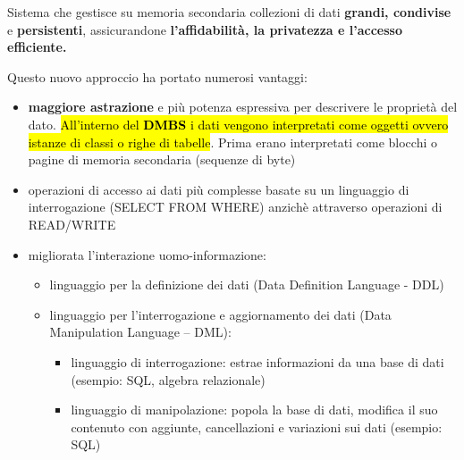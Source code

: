 \documentclass[a4paper, 12pt]{book}
\begin{document}

    \vspace{15pt}

    \begin{tcolorbox}[
      colback=cyan!5!white,
      colframe=blue!50!black,
      title=\textbf{Definizione - DBMS},
      coltitle=white,
      fonttitle=\bfseries,
      arc=3mm,
      boxrule=0.5pt,
      enhanced,
      breakable
    ]
    Sistema che gestisce su memoria secondaria collezioni di dati \textbf{grandi, condivise} e \textbf{persistenti}, assicurandone \textbf{l'affidabilità, la privatezza e l'accesso efficiente.}
    \end{tcolorbox}

    \vspace{15pt}



    Questo nuovo approccio ha portato numerosi vantaggi:
    \begin{itemize}
      \item \textbf{maggiore astrazione} e più potenza espressiva per descrivere le proprietà del dato.
      \hl{All'interno del \textbf{DMBS} i dati vengono interpretati come oggetti ovvero istanze di classi o righe di tabelle}. Prima erano interpretati come blocchi o pagine di memoria secondaria (sequenze di byte)
      \item operazioni di accesso ai dati più complesse basate su un linguaggio di interrogazione (SELECT FROM WHERE) anzichè attraverso operazioni di READ/WRITE
      \item migliorata l'interazione uomo-informazione: 
      \begin{itemize}
        \item linguaggio per la definizione dei dati (Data Definition Language - DDL)
        \item linguaggio per l’interrogazione e aggiornamento dei dati (Data Manipulation Language – DML): 
        \begin{itemize}
          \item linguaggio di interrogazione: estrae informazioni da una base di dati (esempio: SQL, algebra relazionale)
          \item linguaggio di manipolazione: popola la base di dati, modifica il suo contenuto con aggiunte, cancellazioni e variazioni sui dati (esempio: SQL)
        \end{itemize}
      \end{itemize}
    \end{itemize}
\end{document}
